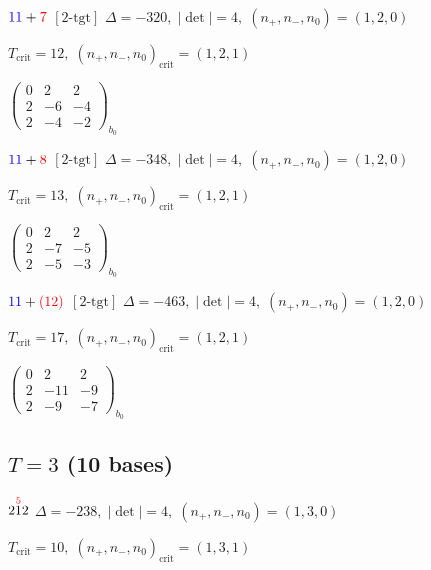\documentclass[10pt]{article}
\begin{document}
$\textcolor{blue}{1}\textcolor{blue}{1}+\textcolor{red}{7}$ $\scriptstyle [2\text{-tgt}]$ \quad $\Delta=-320,\; |\det|=4,\; (n_+,n_-,n_0)=(1,2,0)$

\hspace{1em}$T_{\text{crit}}=12,\; (n_+,n_-,n_0)_{\text{crit}}=(1,2,1)$

\hspace{2em}$\left(\begin{smallmatrix}0 & 2 & 2 \\ 2 & -6 & -4 \\ 2 & -4 & -2\end{smallmatrix}\right)_{\!b_0}$

$\textcolor{blue}{1}\textcolor{blue}{1}+\textcolor{red}{8}$ $\scriptstyle [2\text{-tgt}]$ \quad $\Delta=-348,\; |\det|=4,\; (n_+,n_-,n_0)=(1,2,0)$

\hspace{1em}$T_{\text{crit}}=13,\; (n_+,n_-,n_0)_{\text{crit}}=(1,2,1)$

\hspace{2em}$\left(\begin{smallmatrix}0 & 2 & 2 \\ 2 & -7 & -5 \\ 2 & -5 & -3\end{smallmatrix}\right)_{\!b_0}$

$\textcolor{blue}{1}\textcolor{blue}{1}+\textcolor{red}{(12)}$ $\scriptstyle [2\text{-tgt}]$ \quad $\Delta=-463,\; |\det|=4,\; (n_+,n_-,n_0)=(1,2,0)$

\hspace{1em}$T_{\text{crit}}=17,\; (n_+,n_-,n_0)_{\text{crit}}=(1,2,1)$

\hspace{2em}$\left(\begin{smallmatrix}0 & 2 & 2 \\ 2 & -11 & -9 \\ 2 & -9 & -7\end{smallmatrix}\right)_{\!b_0}$


\subsection*{$T = 3$ \quad (10 bases)}
\smallskip

$2\overset{\textcolor{red}{5}}{1}2$ \quad $\Delta=-238,\; |\det|=4,\; (n_+,n_-,n_0)=(1,3,0)$

\hspace{1em}$T_{\text{crit}}=10,\; (n_+,n_-,n_0)_{\text{crit}}=(1,3,1)$
\end{document}

